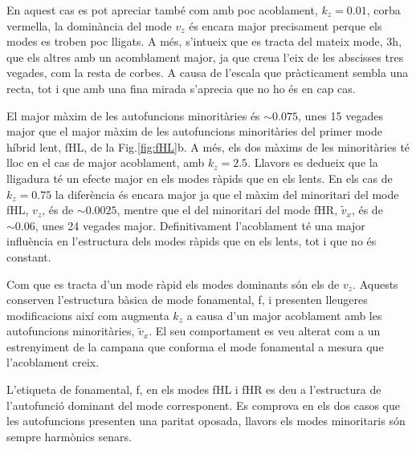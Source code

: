 En aquest cas es pot apreciar també com amb poc acoblament, $k_z = 0.01$,
corba vermella, la dominància del mode $v_z$ és encara major precisament perque els modes es troben poc lligats.
A més, s'intueix que es tracta del mateix mode, 3h, que els altres amb un acomblament major,
ja que creua l'eix de les abscisses tres vegades, com la resta de corbes.
A causa de l'escala que pràcticament sembla una recta, tot i que amb una fina mirada s'aprecia que no ho és en cap cas.

El major màxim de les autofuncions minoritàries és $\sim 0.075$,
unes 15 vegades major que el major màxim de les autofuncions minoritàries del primer mode híbrid lent, fHL, de la Fig.\ref{fig:fHL}b.
A més, els dos màxims de les minoritàries té lloc en el cas de major acoblament, amb $k_z = 2.5$.
Llavors es dedueix que la lligadura té un efecte major en els modes ràpids que en els lents.
En els cas de $k_z = 0.75$ la diferència és encara major ja que el màxim del minoritari del mode fHL, $v_z$, és de $\sim 0.0025$,
mentre que el del minoritari del mode fHR, $\tilde{v}_{x}$, és de $\sim 0.06$, unes 24 vegades major.
Definitivament l'acoblament té una major influència en l'estructura dels modes ràpids que en els lents, tot i que no és constant.

Com que es tracta d'un mode ràpid els modes dominants són els de $v_z$. Aquests conserven l'estructura bàsica de mode fonamental, f,
i presenten lleugeres modificacions així com augmenta $k_z$ a causa d'un major acoblament amb les autofuncions minoritàries, $\tilde{v}_{x}$.
El seu comportament es veu alterat com a un estrenyiment de la campana que conforma el mode fonamental a mesura que l'acoblament creix.

L'etiqueta de fonamental, f, en els modes fHL i fHR es deu a l'estructura de l'autofunció dominant del mode corresponent.
Es comprova en els dos casos que les autofuncions presenten una paritat oposada, llavors els modes minoritaris són sempre harmònics senars.
